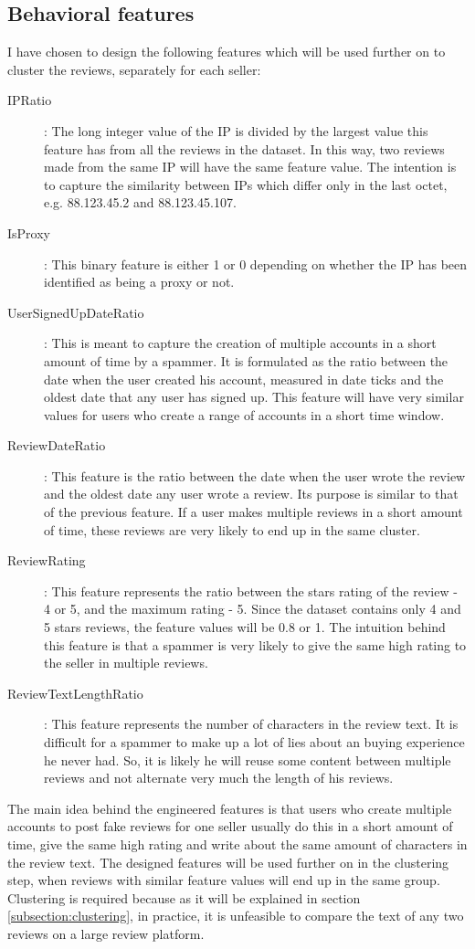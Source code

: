 \subsection{Behavioral features}
I have chosen to design the following features which will be used further on to cluster the reviews, separately for each seller:
\begin{description}
\item[IPRatio]: The long integer value of the IP is divided by the largest value this feature has from all the reviews in the dataset. In this way, two reviews made from the same IP will have the same feature value. The intention is to capture the similarity between IPs which differ only in the last octet, e.g. 88.123.45.2 and 88.123.45.107.
\item[IsProxy]: This binary feature is either 1 or 0 depending on whether the IP has been identified as being a proxy or not.
\item[UserSignedUpDateRatio]:  This is meant to capture the creation of multiple accounts in a short amount of time by a spammer. It is formulated as the ratio between the date when the user created his account, measured in date ticks and the oldest date that any user has signed up. This feature will have very similar values for users who create a range of accounts in a short time window.
\item[ReviewDateRatio]: This feature is the ratio between the date when the user wrote the review and the oldest date any user wrote a review. Its purpose is similar to that of the previous feature. If a user makes multiple reviews in a short amount of time, these reviews are very likely to end up in the same cluster.
\item[ReviewRating]: This feature represents the ratio between the stars rating of the review - 4 or 5, and the maximum rating - 5. Since the dataset contains only 4 and 5 stars reviews, the feature values will be 0.8 or 1. The intuition behind this feature is that a spammer is very likely to give the same high rating to the seller in multiple reviews. 
\item[ReviewTextLengthRatio]: This feature represents the number of characters in the review text. It is difficult for a spammer to make up a lot of lies about an buying experience he never had. So, it is likely he will reuse some content between multiple reviews and not alternate very much the length of his reviews. 
\end{description}

The main idea behind the engineered features is that users who create multiple accounts to post fake reviews for one seller usually do this in a short amount of time, give the same high rating and write about the same amount of characters in the review text. The designed features will be used further on in the clustering step, when reviews with similar feature values will end up in the same group. Clustering is required because as it will be explained in section \ref{subsection:clustering}, in practice, it is unfeasible to compare the text of any two reviews on a large review platform. 

